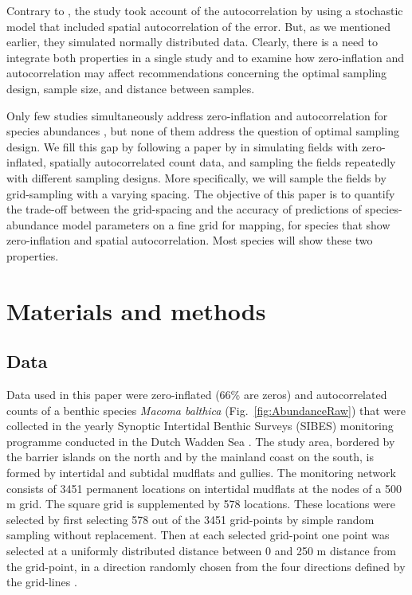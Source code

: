 \documentclass[review]{elsarticle}
\begin{document}
Contrary to \citet{tyre2003}, the \citeauthor{bijleveld2012} study took account of the autocorrelation by using a stochastic model that included spatial autocorrelation of the error. But, as we mentioned earlier, they simulated normally distributed data. Clearly, there is a need to integrate both properties in a single study and to examine how zero-inflation and autocorrelation may affect recommendations concerning the optimal sampling design, sample size, and distance between samples.

Only few studies simultaneously address zero-inflation and autocorrelation for species abundances \citep[see e.g.][]{recta2012, boyd2015}, but none of them address the question of optimal sampling design.  We fill this gap by following a paper by \citet{lyashevska2016a} in simulating fields with zero-inflated, spatially autocorrelated count data, and sampling the fields repeatedly with different sampling designs. More specifically, we will sample the fields by grid-sampling with a varying spacing. The objective of this paper is to quantify the trade-off between the grid-spacing and the accuracy of predictions of species-abundance model parameters on a fine grid for mapping, for species that show zero-inflation and spatial autocorrelation. Most species will show these two properties.

\section{Materials and methods} \label{sec:methods}

\subsection{Data}

Data used in this paper were zero-inflated (66\% are zeros) and autocorrelated counts of a benthic species \textit{Macoma balthica} (Fig.~\ref{fig:AbundanceRaw}) that were collected in the yearly Synoptic Intertidal Benthic Surveys (SIBES) monitoring programme conducted in the Dutch Wadden Sea \citep{bijleveld2012, compton2013}. The study area, bordered by the barrier islands on the north and by the mainland coast on the south, is formed by intertidal and subtidal mudflats and gullies. The monitoring network consists of 3451 permanent locations on intertidal mudflats at the nodes of a 500 m grid. The square grid is supplemented by 578 locations. These locations were selected by first selecting 578 out of the 3451 grid-points by simple random sampling without replacement. Then at each selected grid-point one point was selected at a uniformly distributed distance between 0 and 250 m distance from the grid-point, in a direction randomly chosen from the four directions defined by the grid-lines \citep{bijleveld2012}.
\end{document}
